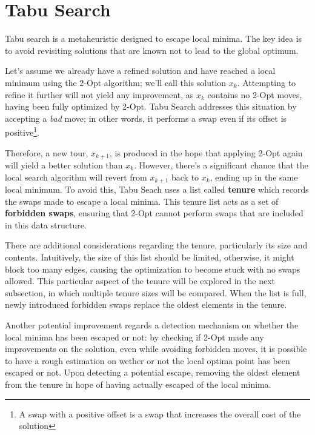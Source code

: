 \section{Tabu Search}

Tabu search is a metaheuristic designed to escape local minima.
The key idea is to avoid revisiting solutions that are known not to lead to the global optimum.

Let's assume we already have a refined solution and have reached a local minimum using the 2-Opt algorithm; we'll call this solution $x_k$.
Attempting to refine it further will not yield any improvement, as $x_k$ contains no 2-Opt moves, having been fully optimized by 2-Opt.
Tabu Search addresses this situation by accepting a \textit{bad} move; in other words, it performs a swap even if its offset is positive\footnote{A swap with a positive offset is a swap that increases the overall cost of the solution}.

Therefore, a new tour, $x_{k+1}$, is produced in the hope that applying 2-Opt again will yield a better solution than $x_k$.
However, there's a significant chance that the local search algorithm will revert from $x_{k+1}$ back to $x_k$, ending up in the same local minimum.
To avoid this, Tabu Seach uses a list called \textbf{tenure} which records the swaps made to escape a local minima.
This tenure list acts as a set of \textbf{forbidden swaps}, ensuring that 2-Opt cannot perform swaps that are included in this data structure.

There are additional considerations regarding the tenure, particularly its size and contents.
Intuitively, the size of this list should be limited, otherwise, it might block too many edges, causing the optimization to become stuck with no swaps allowed.
This particular aspect of the tenure will be explored in the next subsection, in which multiple tenure sizes will be compared.
When the list is full, newly introduced forbidden swaps replace the oldest elements in the tenure.

Another potential improvement regards a detection mechanism on whether the local minima has been escaped or not: by checking if 2-Opt made any improvements on the solution, even while avoiding forbidden moves, it is possible to have a rough estimation on wether or not the local optima point has been escaped or not.
Upon detecting a potential escape, removing the oldest element from the tenure in hope of having actually escaped of the local minima.

